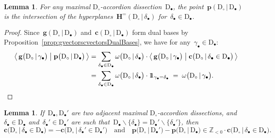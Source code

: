 \documentclass{amsart}
\newtheorem{lemma}[theorem]{Lemma}
\theoremstyle{definition}
\newcommand{\Z}{\mathbb{Z}} %
\newcommand{\ssm}{\smallsetminus} %
\newcommand{\dotprod}[2]{\left\langle \, #1 \; \middle| \; #2 \, \right\rangle} %
\newcommand{\one}{{1\!\!1}} %
\newcommand{\dissection}{\mathrm{D}} %
\newcommand{\biggvector}[2]{\mathbf{g} \big( #1 \,|\, #2 \big)} %
\newcommand{\gvectors}[2]{\mathbf{g}(#1 \,|\, #2)} %
\newcommand{\bigcvector}[3]{\mathbf{c} \big( #1  \,|\, #3 \in #2 \big)} %
\newcommand{\cvectors}[2]{\mathbf{c}(#1  \,|\, #2)} %
\newcommand{\bigrhs}[2]{\omega \big( #1  \,|\, #2 \big)} %
\newcommand{\point}[2]{\mathbf{p}(#1  \,|\, #2)} %
\newcommand{\bigpoint}[2]{\mathbf{p} \big( #1  \,|\, #2 \big)} %
\newcommand{\Hyp}[2]{\mathbf{H}^{=}(#1 \,|\, #2 )} %
\begin{document}
\begin{lemma}
\label{lem:pointInHyp}
For any maximal $\dissection_\circ$-accordion dissection~$\dissection_\bullet$, the point~$\point{\dissection_\circ}{\dissection_\bullet}$ is the intersection of the hyperplanes~$\Hyp{\dissection_\circ}{\delta_\bullet}$ for~$\delta_\bullet \in \dissection_\bullet$.
\end{lemma}

\begin{proof}
Since~$\gvectors{\dissection_\circ}{\dissection_\bullet}$ and~$\cvectors{\dissection_\circ}{\dissection_\bullet}$ form dual bases by Proposition~\ref{prop:gvectorscvectorsDualBases}, we have for any~$\gamma_\bullet \in \dissection_\bullet$:
\begin{align*}
\dotprod{\biggvector{\dissection_\circ}{\gamma_\bullet}}{\bigpoint{\dissection_\circ}{\dissection_\bullet}}
& = \sum_{\delta_\bullet \in \dissection_\bullet} \bigrhs{\dissection_\circ}{\delta_\bullet} \cdot \dotprod{\biggvector{\dissection_\circ}{\gamma_\bullet}}{\bigcvector{\dissection_\circ}{\dissection_\bullet}{\delta_\bullet}} \\
& = \sum_{\delta_\bullet \in \dissection_\bullet} \bigrhs{\dissection_\circ}{\delta_\bullet} \cdot \one_{\gamma_\bullet = \delta_\bullet} \; = \; \bigrhs{\dissection_\circ}{\gamma_\bullet}.
\qedhere
\end{align*}
\end{proof}

\begin{lemma}
\label{lem:factorcvectorFlip}
If~$\dissection_\bullet, \dissection_\bullet'$ are two adjacent maximal $\dissection_\circ$-accordion dissections, and~$\delta_\bullet \in \dissection_\bullet$ and~${\delta_\bullet' \in \dissection_\bullet'}$ are such that~${\dissection_\bullet \ssm \{\delta_\bullet\} = \dissection_\bullet' \ssm \{\delta_\bullet'\}}$, then
\[
\bigcvector{\dissection_\circ}{\dissection_\bullet}{\delta_\bullet} = - \bigcvector{\dissection_\circ}{\dissection_\bullet'}{\delta_\bullet'}
\quad\text{and}\quad
\bigpoint{\dissection_\circ}{\dissection_\bullet'} - \bigpoint{\dissection_\circ}{\dissection_\bullet} \in \Z_{<0} \cdot \bigcvector{\dissection_\circ}{\dissection_\bullet}{\delta_\bullet}.
\]
\end{lemma}
\end{document}
